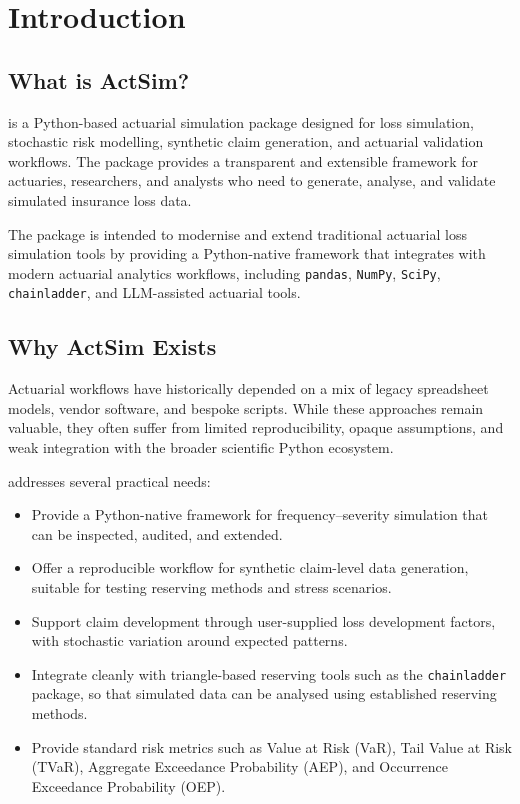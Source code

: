 \chapter{Introduction}
\label{chap:introduction}

\section{What is ActSim?}

\actsim is a Python-based actuarial simulation package designed for loss
simulation, stochastic risk modelling, synthetic claim generation, and
actuarial validation workflows. The package provides a transparent and
extensible framework for actuaries, researchers, and analysts who need to
generate, analyse, and validate simulated insurance loss data.

The package is intended to modernise and extend traditional actuarial
loss simulation tools by providing a Python-native framework that integrates
with modern actuarial analytics workflows, including \texttt{pandas},
\texttt{NumPy}, \texttt{SciPy}, \texttt{chainladder}, and LLM-assisted
actuarial tools.

\section{Why ActSim Exists}

Actuarial workflows have historically depended on a mix of legacy spreadsheet
models, vendor software, and bespoke scripts. While these approaches remain
valuable, they often suffer from limited reproducibility, opaque assumptions,
and weak integration with the broader scientific Python ecosystem.

\actsim addresses several practical needs:

\begin{itemize}[leftmargin=*]
    \item Provide a Python-native framework for frequency--severity simulation
          that can be inspected, audited, and extended.
    \item Offer a reproducible workflow for synthetic claim-level data
          generation, suitable for testing reserving methods and stress
          scenarios.
    \item Support claim development through user-supplied loss development
          factors, with stochastic variation around expected patterns.
    \item Integrate cleanly with triangle-based reserving tools such as the
          \texttt{chainladder} package, so that simulated data can be
          analysed using established reserving methods.
    \item Provide standard risk metrics such as Value at Risk (VaR),
          Tail Value at Risk (TVaR), Aggregate Exceedance Probability (AEP),
          and Occurrence Exceedance Probability (OEP).
\end{itemize}

